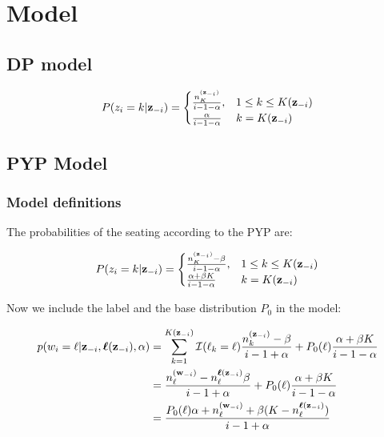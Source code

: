 \section{Model}

\subsection{DP model}

\begin{align}
P(z_i=k|\bm{\mathbf{z}}_{-i}) = 
\begin{cases}
    \frac{n_K^{(\bm{\mathbf{z}}_{-i})}}{i - 1 - \alpha},& 1 \le k \le K(\bm{\mathbf{z}}_{-i})\\
    \frac{\alpha}{i - 1 - \alpha}              & k = K(\bm{\mathbf{z}}_{-i})\\
\end{cases}
\end{align}

\subsection{PYP Model}
\subsubsection{Model definitions}

The probabilities of the seating according to the PYP are:

\begin{align}
P(z_i=k|\bm{\mathbf{z}}_{-i}) = 
\begin{cases}
    \frac{n_K^{(\bm{\mathbf{z}}_{-i})} - \beta}{i - 1 - \alpha},& 1 \le k \le K(\bm{\mathbf{z}}_{-i})\\
    \frac{\alpha + \beta K}{i - 1 - \alpha}              & k = K(\bm{\mathbf{z}}_{-i})\\
\end{cases}
\end{align}

Now we include the label and the base distribution $P_0$ in the model:

\begin{align}
p(w_i=\ell|\bm{\mathbf{z}}_{-i},\bm{\mathbf{\ell}}(\bm{\mathbf{z}}_{-i}),\alpha) &= \sum_{k=1}^{K(\bm{\mathbf{z}}_{-i})}\mathcal{I}(\ell_k=\ell)\dfrac{n_k^{(\bm{\mathbf{z}}_{-i})}-\beta}{i - 1 + \alpha} + P_0(\ell)\dfrac{\alpha + \beta K}{i -1 -\alpha} \\
&= \dfrac{n_{\ell}^{(\bm{\mathbf{w}}_{-i})}- n_{\ell}^{\bm{\mathbf{\ell}}(\bm{\mathbf{z}}_{-i})}\beta}{i - 1 + \alpha} + P_0(\ell)\dfrac{\alpha + \beta K}{i -1 -\alpha} \\
&= \dfrac{P_0(\ell)\alpha + n_{\ell}^{(\bm{\mathbf{w}}_{-i})}+ \beta (K - n_{\ell}^{\bm{\mathbf{\ell}}(\bm{\mathbf{z}}_{-i})})}{i - 1 + \alpha} 
\end{align}

